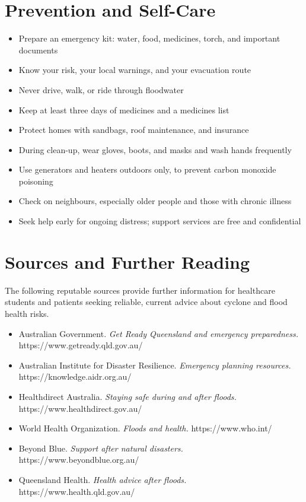 \section*{Prevention and Self-Care}
\begin{itemize}
    \item Prepare an emergency kit: water, food, medicines, torch, and important documents
    \item Know your risk, your local warnings, and your evacuation route
    \item Never drive, walk, or ride through floodwater
    \item Keep at least three days of medicines and a medicines list
    \item Protect homes with sandbags, roof maintenance, and insurance
    \item During clean-up, wear gloves, boots, and masks and wash hands frequently
    \item Use generators and heaters outdoors only, to prevent carbon monoxide poisoning
    \item Check on neighbours, especially older people and those with chronic illness
    \item Seek help early for ongoing distress; support services are free and confidential
\end{itemize}

\section*{Sources and Further Reading}
The following reputable sources provide further information for healthcare students and patients seeking reliable, current advice about cyclone and flood health risks.

\begin{itemize}
    \item Australian Government. \textit{Get Ready Queensland and emergency preparedness.} https://www.getready.qld.gov.au/
    \item Australian Institute for Disaster Resilience. \textit{Emergency planning resources.} https://knowledge.aidr.org.au/
    \item Healthdirect Australia. \textit{Staying safe during and after floods.} https://www.healthdirect.gov.au/
    \item World Health Organization. \textit{Floods and health.} https://www.who.int/
    \item Beyond Blue. \textit{Support after natural disasters.} https://www.beyondblue.org.au/
    \item Queensland Health. \textit{Health advice after floods.} https://www.health.qld.gov.au/
\end{itemize}
